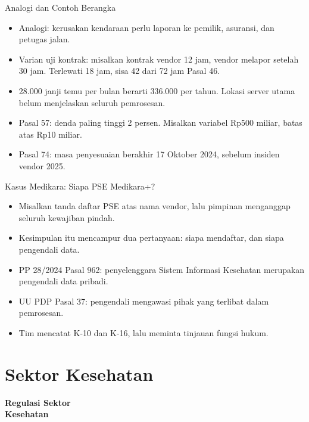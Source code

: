 \documentclass[aspectratio=169, table, 12pt]{beamer}
\begin{document}
\begin{frame}{{\Large Analogi dan Contoh Berangka}}
  \vspace{4pt}
  \small
  \begin{itemize}
    \item Analogi: kerusakan kendaraan perlu laporan ke pemilik, asuransi, dan petugas jalan.
    \item Varian uji kontrak: misalkan kontrak vendor 12 jam, vendor melapor setelah 30 jam. Terlewati
          18 jam, sisa 42 dari 72 jam Pasal 46.
    \item 28.000 janji temu per bulan berarti 336.000 per tahun. Lokasi server utama belum menjelaskan
          seluruh pemrosesan.
    \item Pasal 57: denda paling tinggi 2 persen. Misalkan variabel Rp500 miliar, batas atas Rp10 miliar.
    \item Pasal 74: masa penyesuaian berakhir 17 Oktober 2024, sebelum insiden vendor 2025.
  \end{itemize}
\end{frame}

\begin{frame}{{\Large Kasus Medikara: Siapa PSE Medikara+?}}
  \vspace{4pt}
  \small
  \begin{itemize}
    \item Misalkan tanda daftar PSE atas nama vendor, lalu pimpinan menganggap seluruh kewajiban pindah.
    \item Kesimpulan itu mencampur dua pertanyaan: siapa mendaftar, dan siapa pengendali data.
    \item PP 28/2024 Pasal 962: penyelenggara Sistem Informasi Kesehatan merupakan pengendali data pribadi.
    \item UU PDP Pasal 37: pengendali mengawasi pihak yang terlibat dalam pemrosesan.
    \item Tim mencatat K-10 dan K-16, lalu meminta tinjauan fungsi hukum.
  \end{itemize}
\end{frame}

\section{Sektor Kesehatan}

\begin{frame}{\hfill}
  \centering
  \Huge{\textbf{Regulasi Sektor\\Kesehatan}}
\end{frame}
\end{document}
